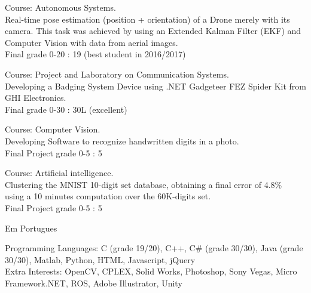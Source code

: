 \documentclass{article}
\begin{document}
\begin{llist}
{
\vspace{-0.4cm}

 
Course: Autonomous Systems.\\
Real-time pose estimation (position + orientation) of a Drone merely with its camera. This task was achieved by using an Extended Kalman Filter (EKF) and Computer Vision with data from aerial images.\\
Final grade 0-20 : 19 (best student in 2016/2017)

 
Course: Project and Laboratory on Communication	Systems.\\
Developing a Badging System Device using .NET Gadgeteer FEZ Spider Kit from GHI Electronics.\\
Final grade 0-30 : 30L (excellent)

 
Course: Computer Vision.\\
Developing Software to recognize handwritten digits in a photo.\\
Final Project grade 0-5 : 5

 
Course: Artificial intelligence.\\
Clustering the MNIST 10-digit set database, obtaining a final error of 4.8\%\\
using a 10 minutes computation over the 60K-digits set.\\
Final Project grade 0-5 : 5

}
{

Em Portugues

}

{
Programming Languages: C (grade 19/20), C++, C\# (grade 30/30), Java (grade 30/30), Matlab, Python, HTML, Javascript, jQuery\\
Extra Interests: OpenCV, CPLEX, Solid Works, Photoshop, Sony Vegas, Micro Framework.NET, ROS, Adobe Illustrator, Unity\\

}
\end{llist}
\end{document}
